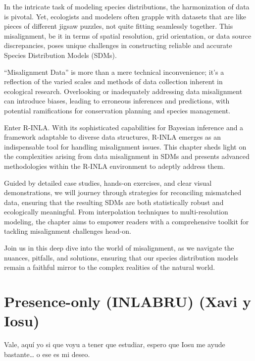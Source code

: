 \documentclass[
]{krantz}
\begin{document}
In the intricate task of modeling species distributions, the harmonization of data is pivotal. Yet, ecologists and modelers often grapple with datasets that are like pieces of different jigsaw puzzles, not quite fitting seamlessly together. This misalignment, be it in terms of spatial resolution, grid orientation, or data source discrepancies, poses unique challenges in constructing reliable and accurate Species Distribution Models (SDMs).

``Misalignment Data'' is more than a mere technical inconvenience; it's a reflection of the varied scales and methods of data collection inherent in ecological research. Overlooking or inadequately addressing data misalignment can introduce biases, leading to erroneous inferences and predictions, with potential ramifications for conservation planning and species management.

Enter R-INLA. With its sophisticated capabilities for Bayesian inference and a framework adaptable to diverse data structures, R-INLA emerges as an indispensable tool for handling misalignment issues. This chapter sheds light on the complexities arising from data misalignment in SDMs and presents advanced methodologies within the R-INLA environment to adeptly address them.

Guided by detailed case studies, hands-on exercises, and clear visual demonstrations, we will journey through strategies for reconciling mismatched data, ensuring that the resulting SDMs are both statistically robust and ecologically meaningful. From interpolation techniques to multi-resolution modeling, the chapter aims to empower readers with a comprehensive toolkit for tackling misalignment challenges head-on.

Join us in this deep dive into the world of misalignment, as we navigate the nuances, pitfalls, and solutions, ensuring that our species distribution models remain a faithful mirror to the complex realities of the natural world.

\pagebreak
\setcounter{chapter}{10}
\setcounter{section}{0}
\renewcommand{\thepage}{\arabic{page}}

\hypertarget{presence-only-inlabru-xavi-y-iosu}{%
\chapter{Presence-only (INLABRU) (Xavi y Iosu)}\label{presence-only-inlabru-xavi-y-iosu}}

Vale, aquí yo si que voyu a tener que estudiar, espero que Iosu me ayude bastante\ldots{} o ese es mi deseo.
\end{document}
